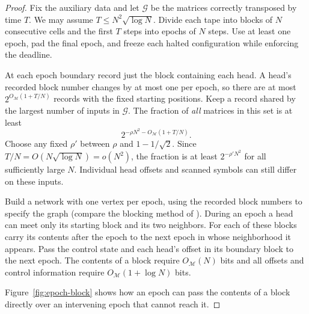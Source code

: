 \begin{proof}
Fix the auxiliary data and let $\mathcal G$ be the matrices correctly
transposed by time $T$. We may assume $T\le N^2\sqrt{\log N}$. Divide
each tape into blocks of $N$ consecutive cells and the first $T$ steps
into epochs of $N$ steps. Use at least one epoch, pad the final epoch,
and freeze each halted configuration while enforcing the deadline.

At each epoch boundary record just the block containing each head.
A head's recorded block number changes by at most one per epoch, so
there are at most $2^{O_{\mathcal M}(1+T/N)}$ records with the fixed
starting positions. Keep a record shared by the largest number of
inputs in $\mathcal G$. The fraction of \emph{all} matrices in this
set is at least
\[
             2^{-\rho N^2-O_{\mathcal M}(1+T/N)}.
\]
Choose any fixed $\rho'$ between $\rho$ and $1-1/\sqrt2$. Since
$T/N=O(N\sqrt{\log N})=o(N^2)$, the fraction is at least
$2^{-\rho'N^2}$ for all sufficiently large $N$. Individual head
offsets and scanned symbols can still differ on these inputs.

Build a network with one vertex per epoch, using the recorded block
numbers to specify the graph (compare the blocking method of
\cite{hpv}). During an epoch a head can meet only its starting block
and its two neighbors. For each of these blocks carry its contents
after the epoch to the next epoch in whose neighborhood it appears.
Pass the control state and each head's offset in its boundary block
to the next epoch. The contents of a block require $O_{\mathcal M}(N)$
bits and all offsets and control information require
$O_{\mathcal M}(1+\log N)$ bits.

Figure~\ref{fig:epoch-block} shows how an epoch can pass the contents of
a block directly over an intervening epoch that cannot reach it.


\end{proof}
